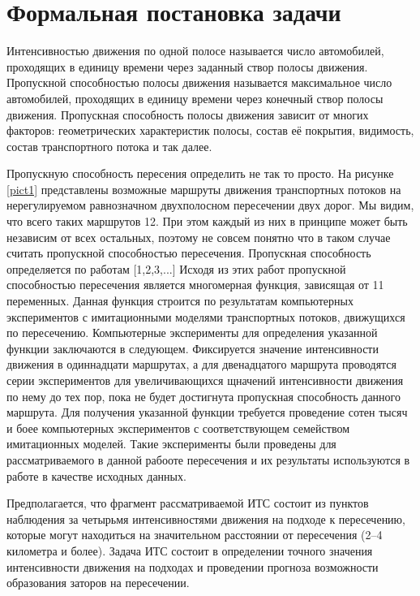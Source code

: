 \documentclass[a4paper,14pt]{article}
\begin{document}
\section{Формальная постановка задачи}

Интенсивностью движения по одной полосе называется число автомобилей, проходящих в единицу времени через заданный створ полосы движения. Пропускной способностью полосы движения называется максимальное число автомобилей, проходящих в единицу времени через конечный створ полосы движения. Пропускная способность полосы движения зависит от многих факторов: геометрических характеристик полосы, состав её покрытия, видимость, состав транспортного потока и так далее.

Пропускную способность пересения определить не так то просто. 
На рисунке \ref{pict1} представлены возможные маршруты движения транспортных потоков на нерегулируемом равнозначном двухполосном пересечении двух дорог. Мы видим, что всего таких маршрутов 12. При этом каждый из них в принципе может быть независим от всех остальных, поэтому не совсем понятно что в таком случае считать пропускной способностью пересечения. Пропускная способность определяется по работам [1,2,3,...]
Исходя из этих работ пропускной способностью пересечения является многомерная функция, зависящая от 11 переменных. Данная функция строится по результатам компьютерных экспериментов с имитационными моделями транспортных потоков, движущихся по пересечению. Компьютерные эксперименты для определения указанной функции заключаются в следующем. Фиксируется значение интенсивности движения в одиннадцати маршрутах, а для двенадцатого маршрута проводятся серии экспериментов для увеличивающихся щначений интенсивности движения по нему до тех пор, пока не будет достигнута пропускная способность данного маршрута. Для получения указанной функции требуется проведение сотен тысяч и боее компьютерных экспериментов с соответствующем семейством имитационных моделей. Такие эксперименты были проведены для рассматриваемого в данной рабооте пересечения и их результаты используются в работе в качестве исходных данных. 

Предполагается, что фрагмент рассматриваемой ИТС состоит из пунктов наблюдения за четырьмя интенсивностями движения на подходе к пересечению, которые могут находиться на значительном расстоянии от пересечения (2--4 километра и более). Задача ИТС состоит в определении точного значения интенсивности движения на подходах и проведении прогноза возможности образования заторов на пересечении. 
\end{document}
